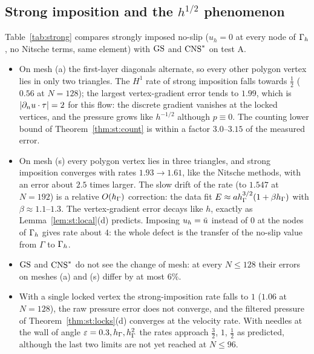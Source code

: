 \subsection{Strong imposition and the \texorpdfstring{$h^{1/2}$}{h^(1/2)} phenomenon}\label{sec:num:strong}
Table~\ref{tab:strong} compares strongly imposed no-slip ($u_h=0$ at every node of $\Gamma_h$, no Nitsche terms, same element) with $\mathrm{GS}$ and $\mathrm{CNS}^\ast$ on test A.
\begin{itemize}
\item On mesh (a) the first-layer diagonals alternate, so every other polygon vertex lies in only two triangles. The $H^1$ rate of strong imposition falls towards $\frac12$ ($0.56$ at $N=128$); the largest vertex-gradient error tends to $1.99$, which is $|\partial_n u\cdot\tau|=2$ for this flow: the discrete gradient vanishes at the locked vertices, and the pressure grows like $h^{-1/2}$ although $p\equiv0$. The counting lower bound of Theorem~\ref{thm:st:count} is within a factor $3.0$--$3.15$ of the measured error.
\item On mesh (s) every polygon vertex lies in three triangles, and strong imposition converges with rates $1.93\to1.61$, like the Nitsche methods, with an error about $2.5$ times larger. The slow drift of the rate (to $1.547$ at $N=192$) is a relative $O(h_\Gamma)$ correction: the data fit $E\approx ah_\Gamma^{3/2}(1+\beta h_\Gamma)$ with $\beta\approx1.1$--$1.3$. The vertex-gradient error decays like $h$, exactly as Lemma~\ref{lem:st:local}(d) predicts. Imposing $u_h=\tilde u$ instead of $0$ at the nodes of $\Gamma_h$ gives rate about $4$: the whole defect is the transfer of the no-slip value from $\Gamma$ to $\Gamma_h$.
\item $\mathrm{GS}$ and $\mathrm{CNS}^\ast$ do not see the change of mesh: at every $N\le128$ their errors on meshes (a) and (s) differ by at most $6\%$.
\item With a single locked vertex the strong-imposition rate falls to $1$ ($1.06$ at $N=128$), the raw pressure error does not converge, and the filtered pressure of Theorem~\ref{thm:st:locks}(d) converges at the velocity rate. With needles at the wall of angle $\varepsilon=0.3,h_\Gamma,h_\Gamma^2$ the rates approach $\frac32$, $1$, $\frac12$ as predicted, although the last two limits are not yet reached at $N\le96$.
\end{itemize}

